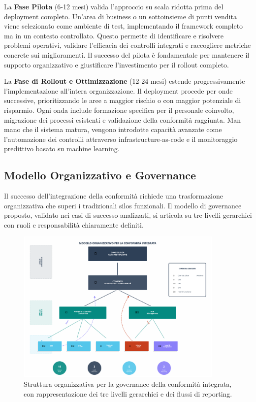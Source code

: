 La \textbf{Fase Pilota} (6-12 mesi) valida l'approccio su scala ridotta prima del deployment completo. Un'area di business o un sottoinsieme di punti vendita viene selezionato come ambiente di test, implementando il framework completo ma in un contesto controllato. Questo permette di identificare e risolvere problemi operativi, validare l'efficacia dei controlli integrati e raccogliere metriche concrete sui miglioramenti. Il successo del pilota è fondamentale per mantenere il supporto organizzativo e giustificare l'investimento per il rollout completo.

La \textbf{Fase di Rollout e Ottimizzazione} (12-24 mesi) estende progressivamente l'implementazione all'intera organizzazione. Il deployment procede per onde successive, prioritizzando le aree a maggior rischio o con maggior potenziale di risparmio. Ogni onda include formazione specifica per il personale coinvolto, migrazione dei processi esistenti e validazione della conformità raggiunta. Man mano che il sistema matura, vengono introdotte capacità avanzate come l'automazione dei controlli attraverso infrastructure-as-code e il monitoraggio predittivo basato su machine learning.

\subsection{Modello Organizzativo e Governance}
\label{subsec:4.5.2_governance}

Il successo dell'integrazione della conformità richiede una trasformazione organizzativa che superi i tradizionali silos funzionali. Il modello di governance proposto, validato nei casi di successo analizzati, si articola su tre livelli gerarchici con ruoli e responsabilità chiaramente definiti.

\begin{figure}[h]
\centering
\includegraphics[width=0.9\textwidth]{thesis_figures/cap4/organigramma_moderno.pdf}
\caption{Struttura organizzativa per la governance della conformità integrata, con rappresentazione dei tre livelli gerarchici e dei flussi di reporting.}
\label{fig:governance}
\end{figure}

